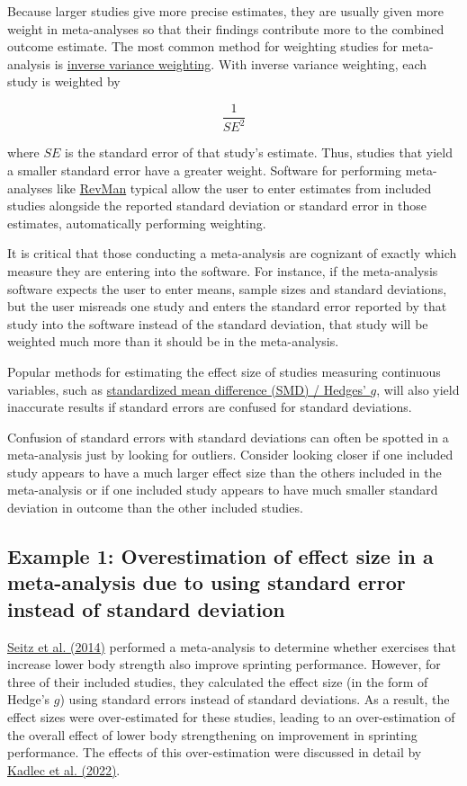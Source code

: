 \documentclass[letterpaper, 12pt]{article}
\begin{document}
Because larger studies give more precise estimates, they are usually given more weight in meta-analyses so that their findings contribute more to the combined outcome estimate. The most common method for weighting studies for meta-analysis is \href{https://training.cochrane.org/handbook/current/chapter-10#section-10-3}{inverse variance weighting}. With inverse variance weighting, each study is weighted by

$$
\frac{1}{SE^2}
$$

where $SE$ is the standard error of that study's estimate. Thus, studies that yield a smaller standard error have a greater weight. Software for performing meta-analyses like \href{https://training.cochrane.org/online-learning/core-software}{RevMan} typical allow the user to enter estimates from included studies alongside the reported standard deviation or standard error in those estimates, automatically performing weighting. 

It is critical that those conducting a meta-analysis are cognizant of exactly which measure they are entering into the software. For instance, if the meta-analysis software expects the user to enter means, sample sizes and standard deviations, but the user misreads one study and enters the standard error reported by that study into the software instead of the standard deviation, that study will be weighted much more than it should be in the meta-analysis.

Popular methods for estimating the effect size of studies measuring continuous variables, such as \href{https://training.cochrane.org/handbook/current/chapter-06#section-6-5-1}{standardized mean difference (SMD) / Hedges' $g$}, will also yield inaccurate results if standard errors are confused for standard deviations.

Confusion of standard errors with standard deviations can often be spotted in a meta-analysis just by looking for outliers. Consider looking closer if one included study appears to have a much larger effect size than the others included in the meta-analysis or if one included study appears to have much smaller standard deviation in outcome than the other included studies.

\subsection*{Example 1: Overestimation of effect size in a meta-analysis due to using standard error instead of standard deviation}

\href{https://doi.org/10.1007/s40279-014-0227-1}{Seitz et al. (2014)} performed a meta-analysis to determine whether exercises that increase lower body strength also improve sprinting performance. However, for three of their included studies, they calculated the effect size (in the form of Hedge's $g$) using standard errors instead of standard deviations. As a result, the effect sizes were over-estimated for these studies, leading to an over-estimation of the overall effect of lower body strengthening on improvement in sprinting performance. The effects of this over-estimation were discussed in detail by \href{https://doi.org/10.1007/s40279-022-01766-0}{Kadlec et al. (2022)}.
\end{document}
